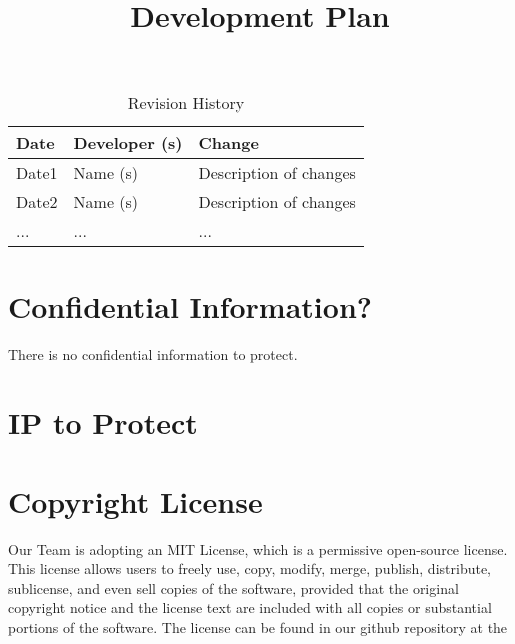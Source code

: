 \documentclass{article}
\title{Development Plan\\\progname}
\author{\authname}
\date{}
\begin{document}
\maketitle

\begin{table}[hp]
\caption{Revision History} \label{TblRevisionHistory}
\begin{tabularx}{\textwidth}{llX}
\toprule
\textbf{Date} & \textbf{Developer (s)} & \textbf{Change}\\
\midrule
Date1 & Name (s) & Description of changes\\
Date2 & Name (s) & Description of changes\\
... & ... & ...\\
\bottomrule
\end{tabularx}
\end{table}

\newpage{}



\section{Confidential Information?}

There is no confidential information to protect.
\section{IP to Protect}


\section{Copyright License}

Our Team is adopting an MIT License, which is a permissive open-source license. This license  allows users to freely use, copy, modify, merge, publish, distribute, sublicense, and even sell copies of the software, provided that the original copyright notice and the license text are included with all copies or substantial portions of the software. The license can be found in our github repository at the 
\end{document}

